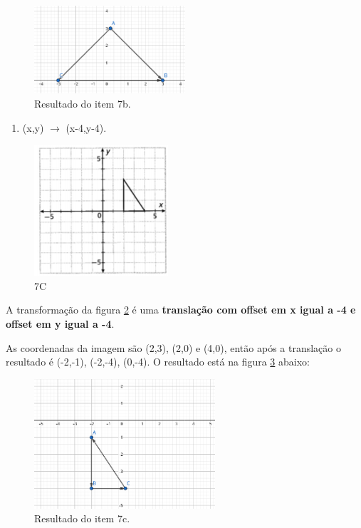 \documentclass[12pt]{article}
\begin{document}
\begin{figure}[H]
    \centering
    \includegraphics[width=0.5\textwidth]{images/7b_resp.png}
    \caption{Resultado do item 7b.}
    \label{fig:7b_resp}
\end{figure}{}

\begin{enumerate}[label=\alph*), resume]
    \item (x,y) $\xrightarrow{}$ (x-4,y-4). 
\end{enumerate}

\begin{figure}[H]
    \centering
    \includegraphics{images/7c.png}
    \caption{7C}
    \label{fig:7c}
\end{figure}{}

A transformação da figura \ref{fig:7c} é uma \textbf{translação com offset em x igual a -4 e offset em y igual a -4}. 

As coordenadas da imagem são (2,3), (2,0) e (4,0), então após a translação o resultado é (-2,-1), (-2,-4), (0,-4). O resultado está na figura \ref{fig:7c_resp} abaixo:

\begin{figure}[H]
    \centering
    \includegraphics[width=0.6\textwidth]{images/7c_resp.png}
    \caption{Resultado do item 7c.}
    \label{fig:7c_resp}
\end{figure}{}
\end{document}
